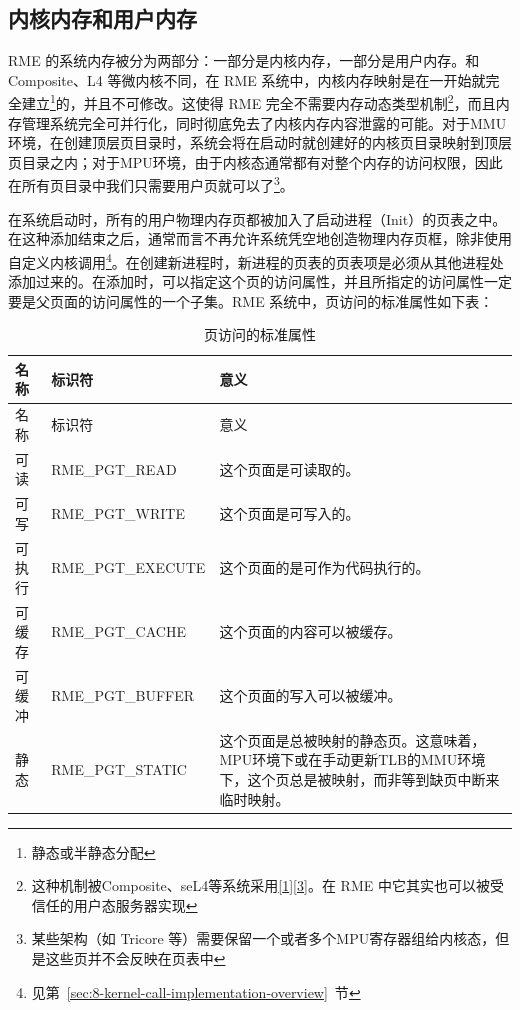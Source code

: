 \subsection{内核内存和用户内存}\label{subsec:3-kernel-memory-and-user-memory}

RME 的系统内存被分为两部分：一部分是内核内存，一部分是用户内存。和 Composite、L4 等微内核不同，在 RME 系统中，内核内存映射是在一开始就完全建立\footnote{静态或半静态分配}的，并且不可修改。这使得 RME 完全不需要内存动态类型机制\footnote{这种机制被Composite、seL4等系统采用\hyperref[cite:3-1]{{[}1{]}}\hyperref[cite:3-3]{{[}3{]}}。在 RME 中它其实也可以被受信任的用户态服务器实现}，而且内存管理系统完全可并行化，同时彻底免去了内核内存内容泄露的可能。对于MMU环境，在创建顶层页目录时，系统会将在启动时就创建好的内核页目录映射到顶层页目录之内；对于MPU环境，由于内核态通常都有对整个内存的访问权限，因此在所有页目录中我们只需要用户页就可以了\footnote{某些架构（如 Tricore 等）需要保留一个或者多个MPU寄存器组给内核态，但是这些页并不会反映在页表中}。

在系统启动时，所有的用户物理内存页都被加入了启动进程（Init）的页表之中。在这种添加结束之后，通常而言不再允许系统凭空地创造物理内存页框，除非使用自定义内核调用\footnote{见第~\ref{sec:8-kernel-call-implementation-overview}~节}。在创建新进程时，新进程的页表的页表项是必须从其他进程处添加过来的。在添加时，可以指定这个页的访问属性，并且所指定的访问属性一定要是父页面的访问属性的一个子集。RME 系统中，页访问的标准属性如下表：

\begin{xltabular}{\textwidth}{@{}>{\hsize\raggedright\arraybackslash}X>{\hsize\raggedright\arraybackslash}X>{\hsize\raggedright\arraybackslash}X@{}}
\caption{页访问的标准属性}\label{tab:3-2-standard-page-access-attributes}\\
\toprule
名称 & 标识符 & 意义\tabularnewline
\endfirsthead
\toprule
名称 & 标识符 & 意义\tabularnewline
\midrule
\endhead
\bottomrule
\endlastfoot
可读 & RME\_PGT\_READ & 这个页面是可读取的。\tabularnewline
可写 & RME\_PGT\_WRITE & 这个页面是可写入的。\tabularnewline
可执行 & RME\_PGT\_EXECUTE &
这个页面的是可作为代码执行的。\tabularnewline
可缓存 & RME\_PGT\_CACHE & 这个页面的内容可以被缓存。\tabularnewline
可缓冲 & RME\_PGT\_BUFFER & 这个页面的写入可以被缓冲。\tabularnewline
静态 & RME\_PGT\_STATIC &
这个页面是总被映射的静态页。这意味着，MPU环境下或在手动更新TLB的MMU环境下，这个页总是被映射，而非等到缺页中断来临时映射。\tabularnewline
\end{xltabular}

